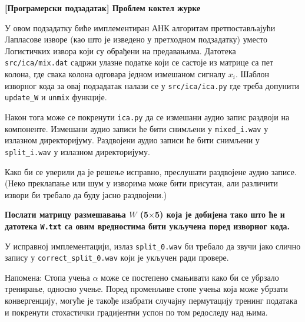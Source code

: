 \item {} \textbf{[Програмерски подзадатак] Проблем коктел журке}

У овом подзадатку биће имплементиран АНК алгоритам претпостављајући Лапласове изворе (као што је изведено у претходном подзадатку) уместо Логистичких извора који су обрађени на предавањима. Датотека \texttt{src/ica/mix.dat} садржи улазне податке који се састоје из матрице са пет колона, где свака колона одговара једном измешаном сигналу $x_i$. Шаблон изворног кода за овај подзадатак налази се у \texttt{src/ica/ica.py} где треба допунити \texttt{update\_W} и \texttt{unmix} функције.

Након тога може се покренути \texttt{ica.py} да се измешани аудио запис раздвоји на компоненте. Измешани аудио записи ће бити снимљени у \texttt{mixed\_i.wav} у излазном директоријуму. Раздвојени аудио записи ће бити снимљени у \texttt{split\_i.wav} у излазном директоријуму.

Како би се уверили да је решење исправно, преслушати раздвојене аудио записе. (Неко преклапање или шум у изворима може бити присутан, али различити извори би требало да буду јасно раздвојени.)

\textbf{Послати матрицу размешавања $W$ (5$\times$5) која је добијена тако што ће и датотека \texttt{W.txt} са овим вредностима бити укључена поред изворног кода.}

У исправној имплементацији, излаз \texttt{split\_0.wav} би требало да звучи јако слично запису у \texttt{correct\_split\_0.wav} који је укључен ради провере.

Напомена: Стопа учења $\alpha$ може се постепено смањивати како би се убрзало тренирање, односно учење. Поред променљиве стопе учења која може убрзати конвергенцију, могуће је такође изабрати случајну пермутацију тренинг података и покренути стохастички градијентни успон по том редоследу над њима.

